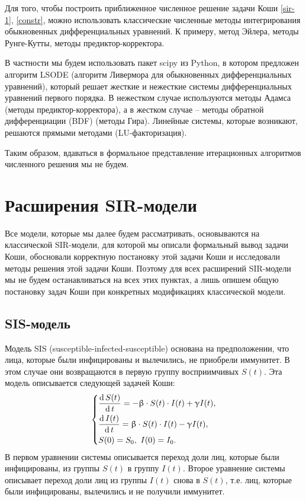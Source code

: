 \documentclass[a4paper, 14pt]{extreport}
\renewcommand{\beta}{\upbeta}
\renewcommand{\gamma}{\upgamma}
\renewcommand{\d}{\operatorname{d}}
\begin{document}
	Для того, чтобы построить приближенное численное решение задачи Коши 
	\eqref{sir-1}, \eqref{constr}, можно использовать классические численные методы интегрирования обыкновенных дифференциальных уравнений. К примеру, метод Эйлера, методы Рунге-Кутты, методы предиктор-корректора.
	
	В частности мы будем использовать пакет scipy из Python, в котором предложен алгоритм LSODE (алгоритм Ливермора для обыкновенных дифференциальных уравнений), который решает жесткие и нежесткие системы дифференциальных уравнений первого порядка. В нежестком случае используются методы Адамса (методы предиктор-корректора), а в жестком случае -- методы обратной дифференциации (BDF) (методы Гира). Линейные системы, которые возникают, решаются прямыми методами (LU-факторизация).
	
	Таким образом, вдаваться в формальное представление итерационных алгоритмов численного решения мы не будем. 
	\section{Расширения SIR-модели}
	Все модели, которые мы далее будем рассматривать, основываются на классической SIR-модели, для которой мы описали формальный вывод задачи Коши, обосновали корректную постановку этой задачи Коши и исследовали методы решения этой задачи Коши. Поэтому для всех расширений SIR-модели мы не будем останавливаться на всех этих пунктах, а лишь опишем общую постановку задач Коши при конкретных модификациях классической модели. 
	\subsection{SIS-модель}
	Модель SIS (susceptible-infected-susceptible) основана на предположении, что лица, которые были инфицированы и вылечились, не приобрели
	иммунитет. В этом случае они возвращаются в первую группу восприимчивых $S(t)$. Эта модель описывается следующей задачей Коши:
	\begin{equation}
		\begin{dcases}
			\dfrac{\d S(t)}{\d t} = - \beta\cdot  S(t)\cdot I(t) + \gamma I(t),\\
		\dfrac{\d I(t)}{\d t} = \beta\cdot S(t)\cdot I(t) - \gamma I(t),\\
		S(0) = S_0,\ I(0) = I_0.
		\end{dcases}
	\end{equation}
	В первом уравнении системы описывается переход доли лиц, которые были инфицированы, из группы $S(t)$ в группу $I(t)$. Второе уравнение системы описывает переход
	доли лиц из группы $I(t)$ снова в $S(t)$, т.е. лиц, которые были инфицированы, вылечились и не получили иммунитет. 
	
\end{document}
